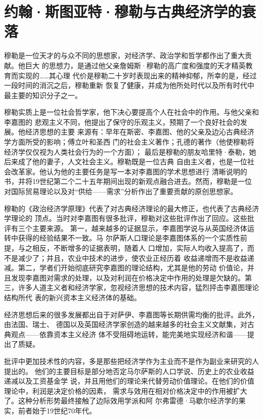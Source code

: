 \chapter{约翰·斯图亚特·穆勒与古典经济学的衰落}
\label{cha:mill}


穆勒是一位天才的与众不同的思想家，对经济学、政治学和哲学都作出了重大贡献。他巨大
的思想力，是通过他父亲詹姆斯·穆勒的高广度和强度的天才精英教育而实现的……其心理
代价是穆勒二十岁时表现出来的精神抑郁，所幸的是，经过一段时间的消沉之后，穆勒重新
恢复了健康，并成为他所处时代以及所有时代中最主要的知识分子之一。

穆勒实质上是一位社会哲学家，他下决心要提高个人在社会中的作用。与他父亲和李嘉图的
悲观主义不同，他提出了保守的乐观主义，预期了一个良好社会的发展。他经济思想的主要
来源有：早年在斯密、李嘉图、他的父亲及边沁古典经济学方面所受的影响；傅立叶和圣西
门的社会主义著作；孔德的著作（他使穆勒将经济学仅仅视为人类社会行为的一个方面）；
最后是穆勒的朋友哈里特·泰勒，她后来成了他的妻子，人文社会主义。穆勒既是一位古典
自由主义者，也是一位社会改革家。他认为他的主要任务是写一本对李嘉图的学术思想进行
清晰说明的书，并将19世纪第二个二十五年期间出现的新观点融合进去。然而，穆勒是一位
对国际贸易理论以及对“供给——需求”分析作出了重要贡献的原创思想家。

穆勒的《政治经济学原理》代表了对古典经济理论的最大修正，也代表了古典经济学理论的
顶点。当时对李嘉图有很多批评，穆勒对这些批评作出了回应。这些批评有三个主要来源。
第一，越来越多的证据显示，李嘉图学说与从英国经济体运转中获得的经验结果不一致。马
尔萨斯人口理论是李嘉图体系的一个实质性前提，与之相反，不断增多的证据表明，随着人
口增加，实际人均收入提高了，而不是减少了；并且，农业中技术的进步，使农业正经历着
收益递增而不是收益递减。第二，学者们开始彻底研究李嘉图的理论结构，尤其是他的劳动
价值论，并且发现李嘉图对需求的处理，以及对利润在价格决定中作用的处理是欠缺的。第
三，许多人道主义者和经济学家，忽视经济思想的技术内容，猛烈抨击李嘉图理论结构所代
表的新兴资本主义经济体的基础。

经济思想后来的很多发展都出自于对萨伊、李嘉图等长期供需均衡的批评。此外，由法国、瑞士、
德国以及英国经济学家创造的越来越多的社会主义文献集，对古典观点——依靠资本主义经济
体不受阻碍地运转，能完美地实现经济和谐——提出了质疑。

批评中更加技术性的内容，多是那些把经济学作为主业而不是作为副业来研究的人提出的。
他们的主要目标是部分地否定马尔萨斯的人口学说、历史上的农业收益递减以及工资基金学
说，并且用他们的理论来代替劳动价值理论。在他们的价值理论中，利润是决定价格的因素，
需求与效用在相对价格决定中的作用被扩大了。这种分析形势最终接触了边际效用学派和阿
尔弗雷德·马歇尔经济学的果实，前者始于19世纪70年代。

